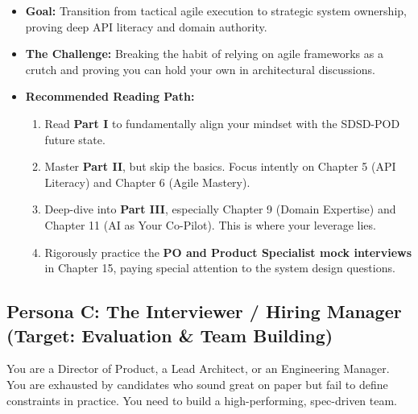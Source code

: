 \begin{itemize}
\tightlist
\item
  \textbf{Goal:} Transition from tactical agile execution to strategic
  system ownership, proving deep API literacy and domain authority.
\item
  \textbf{The Challenge:} Breaking the habit of relying on agile
  frameworks as a crutch and proving you can hold your own in
  architectural discussions.
\item
  \textbf{Recommended Reading Path:}

  \begin{enumerate}
  \def\labelenumi{\arabic{enumi}.}
  \tightlist
  \item
    Read \textbf{Part I} to fundamentally align your mindset with the
    SDSD-POD future state.
  \item
    Master \textbf{Part II}, but skip the basics. Focus intently on
    Chapter 5 (API Literacy) and Chapter 6 (Agile Mastery).
  \item
    Deep-dive into \textbf{Part III}, especially Chapter 9 (Domain
    Expertise) and Chapter 11 (AI as Your Co-Pilot). This is where your
    leverage lies.
  \item
    Rigorously practice the \textbf{PO and Product Specialist mock
    interviews} in Chapter 15, paying special attention to the system
    design questions.
  \end{enumerate}
\end{itemize}

\subsection{Persona C: The Interviewer / Hiring Manager (Target:
Evaluation \& Team
Building)}\label{persona-c-the-interviewer-hiring-manager-target-evaluation-team-building}

You are a Director of Product, a Lead Architect, or an Engineering
Manager. You are exhausted by candidates who sound great on paper but
fail to define constraints in practice. You need to build a
high-performing, spec-driven team.

